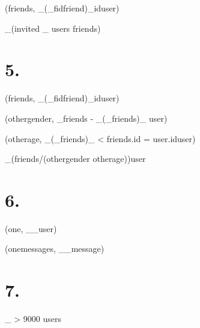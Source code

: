 \documentclass{article}
\begin{document}
\rho(friends, \pi_{}(\pi_{fid}friend)\bowtie_{id}user)


\pi_{}(invited \bowtie_{} users \cup friends)



\chapter{5.}

\rho(friends, \pi_{}(\pi_{fid}friend)\bowtie_{id}user)

\rho(othergender, \pi_{}friends - \pi_{}(\pi_{}friends)\bowtie_{} user)

\rho(otherage, \pi_{}(\pi_{}friends)\bowtie_{ <  \wedge friends.id = user.id}user)

\pi_{}(friends/(othergender \cap otherage))user


\chapter{6.}

\rho(one, \pi_{}\sigma_{}user)

\rho(onemessages, \pi_{}\rho_{}message)




\chapter{7.}

\sigma_{ \wedge {} > 9000 }users
\end{document}
